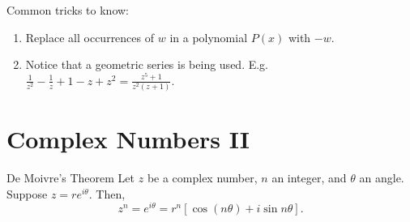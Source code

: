 \documentclass[oneside]{book}
\begin{document}
  \begin{note}
    Common tricks to know:
    \begin{enumerate}
      \item Replace all occurrences of \(w\) in a polynomial \(P(x)\) with \(-w\).
      \item Notice that a geometric series is being used. E.g. \(\frac{1}{z^2}-\frac{1}{z}+1-z+z^2=\frac{z^5+1}{z^2(z+1)}\). 
    \end{enumerate}
  \end{note}
\section{Complex Numbers II}
\begin{theorem}{De Moivre's Theorem}{}
  Let \(z\) be a complex number, \(n\) an integer, and \(\theta\) an angle. Suppose \(z=re^{i\theta}\). Then, 
  \[z^n=e^{i\theta}=r^n[\cos(n\theta)+i\sin{n\theta}].\]
\end{theorem}
\end{document}
